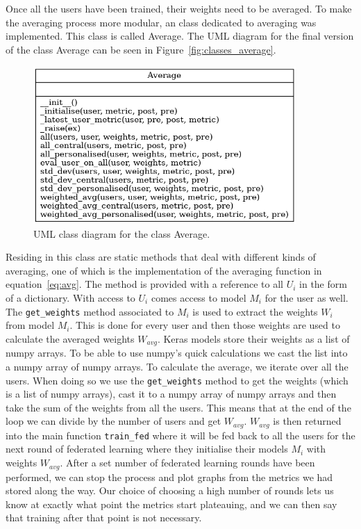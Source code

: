 \documentclass[12pt]{article}
\begin{document}
\\\\
Once all the users have been trained, their weights need to be averaged. To make the averaging process more modular, an class dedicated to averaging was implemented. This class is called Average. The UML diagram for the final version of the class Average can be seen in Figure~\ref{fig:classes_average}.
\begin{figure}[H]
	\centering
	\includegraphics[width=10cm]{resources/classes_Average.png}
	\caption{UML class diagram for the class Average.}
	\label{fig:classes_user}
\end{figure}
\noindent Residing in this class are static methods that deal with different kinds of averaging, one of which is the implementation of the averaging function in equation~\ref{eq:avg}. The method is provided with a reference to all $U_i$ in the form of a dictionary. With access to $U_i$ comes access to model $M_i$ for the user as well. The \texttt{get\_weights} method associated to $M_i$ is used to extract the weights $W_i$ from model $M_i$. This is done for every user and then those weights are used to calculate the averaged weights $W_{avg}$. Keras models store their weights as a list of numpy arrays. To be able to use numpy's quick calculations we cast the list into a numpy array of numpy arrays. To calculate the average, we iterate over all the users. When doing so we use the \texttt{get\_weights} method to get the weights (which is a list of numpy arrays), cast it to a numpy array of numpy arrays and then take the sum of the weights from all the users. This means that at the end of the loop we can divide by the number of users and get $W_{avg}$. $W_{avg}$ is then returned into the main function \texttt{train\_fed} where it will be fed back to all the users for the next round of federated learning where they initialise their models $M_i$ with weights $W_{avg}$. After a set number of federated learning rounds have been performed, we can stop the process and plot graphs from the metrics we had stored along the way. Our choice of choosing a high number of rounds lets us know at exactly what point the metrics start plateauing, and we can then say that training after that point is not necessary. 
\end{document}
